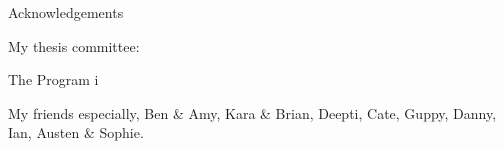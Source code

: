 {\centering
\LARGE
Acknowledgements
\par
}


My thesis committee: 

The Program i

My friends especially, Ben \& Amy, Kara \& Brian, Deepti, Cate, Guppy, Danny, Ian, Austen \& Sophie.

